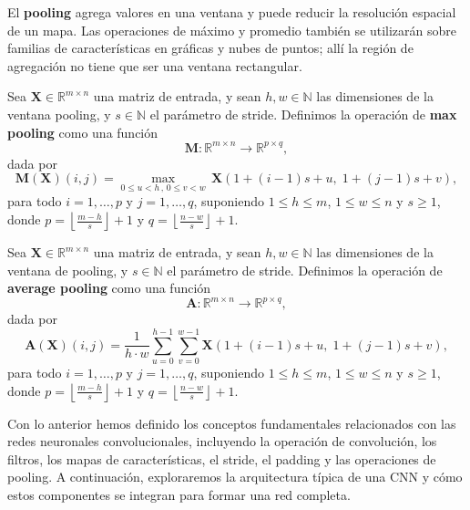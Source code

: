El \textbf{pooling} agrega valores en una ventana y puede reducir la resolución espacial de un mapa. Las operaciones de máximo y promedio también se utilizarán sobre familias de características en gráficas y nubes de puntos; allí la región de agregación no tiene que ser una ventana rectangular.

\begin{definition}
\label{def:max-pooling}

    Sea $\mathbf{X} \in \mathbb{R}^{m \times n}$ una matriz de entrada, y sean $h, w \in \mathbb{N}$ las dimensiones de la ventana pooling, y $s \in \mathbb{N}$ el parámetro de stride.
    Definimos la operación de \textbf{max pooling} como una función
    \[
        \mathbf{M}: \mathbb{R}^{m \times n} \longrightarrow \mathbb{R}^{p \times q},
    \]
    dada por
    \[
        \mathbf{M}(\mathbf{X})(i,j) =
        \max_{0 \leq u < h \, , \, 0 \leq v < w}
        \, \mathbf{X}(1+(i-1)s+u,\;1+(j-1)s+v),
    \]
    para todo $i=1,\ldots,p$ y $j=1,\ldots,q$,
    suponiendo $1\leq h\leq m$, $1\leq w\leq n$ y $s\geq1$, donde $p = \left\lfloor \frac{m - h}{s} \right\rfloor + 1$ y $q = \left\lfloor \frac{n - w}{s} \right\rfloor + 1$.
\end{definition}

\begin{definition}
\label{def:average-pooling}

    Sea $\mathbf{X} \in \mathbb{R}^{m \times n}$ una matriz de entrada, y sean $h, w \in \mathbb{N}$ las dimensiones de la ventana de pooling, y $s \in \mathbb{N}$ el parámetro de stride.
    Definimos la operación de \textbf{average pooling} como una función
    \[
        \mathbf{A}: \mathbb{R}^{m \times n} \longrightarrow \mathbb{R}^{p \times q},
    \]
    dada por
    \[
        \mathbf{A}(\mathbf{X})(i,j) =
        \frac{1}{h \cdot w}
        \sum_{u=0}^{h-1}\sum_{v=0}^{w-1}
        \mathbf{X}(1+(i-1)s+u,\;1+(j-1)s+v),
    \]
    para todo $i=1,\ldots,p$ y $j=1,\ldots,q$,
    suponiendo $1\leq h\leq m$, $1\leq w\leq n$ y $s\geq1$, donde $p = \left\lfloor \frac{m - h}{s} \right\rfloor + 1$ y $q = \left\lfloor \frac{n - w}{s} \right\rfloor + 1$.
\end{definition}

Con lo anterior hemos definido los conceptos fundamentales relacionados con las redes neuronales convolucionales, incluyendo la operación de convolución, los filtros, los mapas de características, el stride, el padding y las operaciones de pooling. A continuación, exploraremos la arquitectura típica de una CNN y cómo estos componentes se integran para formar una red completa.

